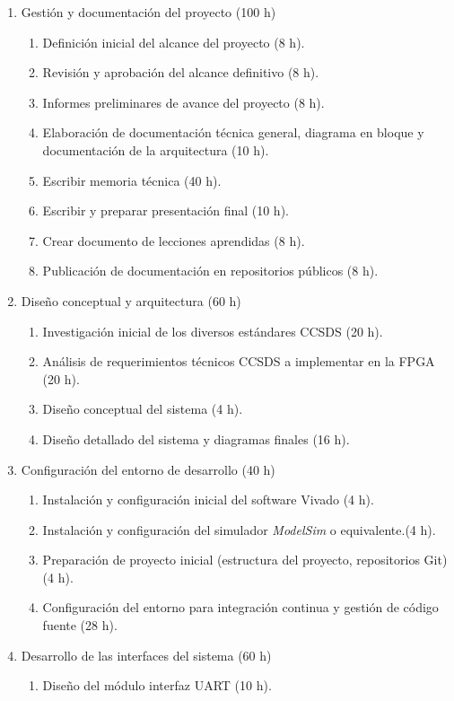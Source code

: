 \documentclass[
11pt, %
]{charter}
\begin{document}
\begin{enumerate}
\item Gestión y documentación del proyecto (100 h)
	\begin{enumerate}
	\item Definición inicial del alcance del proyecto (8 h).
	\item Revisión y aprobación del alcance definitivo (8 h).
	\item Informes preliminares de avance del proyecto (8 h).
	\item Elaboración de documentación técnica general, diagrama en bloque y documentación de la arquitectura (10 h).
	\item Escribir memoria técnica (40 h).
	\item Escribir y preparar presentación final (10 h).
	\item Crear documento de lecciones aprendidas (8 h).	
	\item Publicación de documentación en repositorios públicos (8 h).	
	\end{enumerate}
\item Diseño conceptual y arquitectura (60 h)
	\begin{enumerate}
	\item Investigación inicial de los diversos estándares CCSDS (20 h).
	\item Análisis de requerimientos técnicos CCSDS a implementar en la FPGA (20 h).
	\item Diseño conceptual del sistema (4 h).
	\item Diseño detallado del sistema y diagramas finales (16 h).
	\end{enumerate}
\item  Configuración del entorno de desarrollo (40 h)
	\begin{enumerate}
	\item Instalación y configuración inicial del software Vivado (4 h).
	\item Instalación y configuración del simulador \textit{ModelSim} o equivalente.(4 h).
	\item Preparación de proyecto inicial (estructura del proyecto, repositorios Git) (4 h).
	\item Configuración del entorno para integración continua y gestión de código fuente (28 h).
	\end{enumerate}
\item  Desarrollo de las interfaces del sistema (60 h)
	\begin{enumerate}
	\item Diseño del módulo interfaz UART (10 h).

\end{enumerate}
\end{enumerate}
\end{document}
